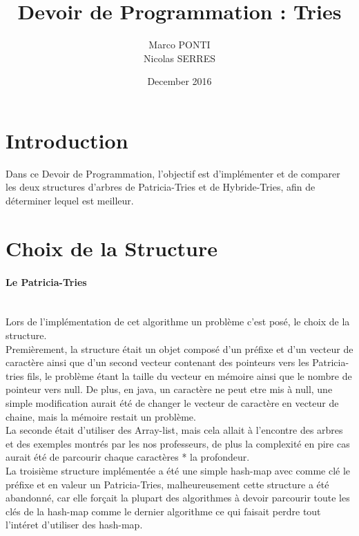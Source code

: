 \documentclass{article}
\title{Devoir de Programmation : Tries}
\author{Marco PONTI\\ Nicolas SERRES}
\date{December 2016}
\begin{document}
\maketitle

\newpage

\section{Introduction}

Dans ce Devoir de Programmation, l'objectif est d'impl\'ementer et de comparer les
deux structures d'arbres de Patricia-Tries et de Hybride-Tries, afin de
d\'eterminer lequel est meilleur.\\

\section{Choix de la Structure}

\paragraph{Le Patricia-Tries\\\\}

Lors de l'impl\'ementation de cet algorithme un probl\`eme c'est pos\'e, le
choix de la structure.\\

Premi\`erement, la structure \'etait un objet compos\'e d'un pr\'efixe et d'un vecteur de
caract\`ere ainsi que d'un second vecteur contenant des pointeurs vers les
Patricia-tries fils, le probl\`eme \'etant la taille du vecteur en m\'emoire ainsi que
le nombre de pointeur vers null. De plus, en java, un caract\`ere ne peut etre mis
\`a null, une simple modification aurait \'et\'e de changer le vecteur de caract\`ere en
vecteur de chaine, mais la m\'emoire restait un probl\`eme.\\

La seconde \'etait d'utiliser des Array-list, mais cela allait \`a l'encontre des
arbres et des exemples montr\'es par les nos professeurs, de plus la complexit\'e en
pire cas aurait \'et\'e de parcourir chaque caract\`eres * la profondeur.\\

La troisi\`eme structure impl\'ement\'ee a \'et\'e une simple hash-map avec comme cl\'e le
pr\'efixe et en valeur un Patricia-Tries, malheureusement cette structure a \'et\'e
abandonn\'e, car elle forçait la plupart des algorithmes \`a devoir parcourir toute
les cl\'es de la hash-map comme le dernier algorithme ce qui faisait perdre tout
l'int\'eret d'utiliser des hash-map.\\
\end{document}
